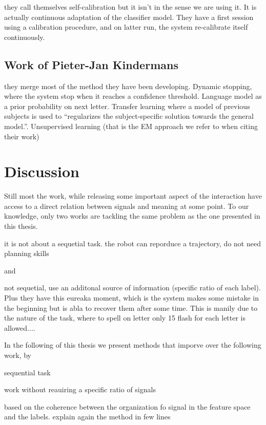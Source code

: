 \cite{schettini2014self} they call themselves self-calibration but it isn't in the sense we are using it. It is actually continuous adaptation of the classifier model. They have a first session using a calibration procedure, and on latter run, the system re-calibrate itself continuously.

\subsection{Work of Pieter-Jan Kindermans}

\cite{kindermans2014integrating} they merge most of the method they have been developing. Dynamic stopping, where the system stop when it reaches a confidence threshold. Language model as a prior probability on next letter. Transfer learning where a model of previous subjects is used to ``regularizes the subject-specific solution towards the general model.''. Unsupervised learning (that is the EM approach we refer to when citing their work)


\section{Discussion}

Still most the work, while releasing some important aspect of the interaction have access to a direct relation between signals and meaning at some point. To our knowledge, only two works are tackling the same problem as the one presented in this thesis.

 
\cite{cederborg2011imitating}
it is not about a sequetial task. the robot can reporduce a trajectory, do not need planning skills

and

\cite{Kindermans2012a,Kindermans2012b,kindermans2014integrating} not sequetial, use an additonal source of information (specific ratio of each label). Plus they have this eureaka moment, which is the system makes some mistake in the beginning but is abla to recover them after some time. This is manily due to the nature of the task, where to spell on letter only 15 flash for each letter is allowed....

In the following of this thesis we present methods that imporve over the following work, by

sequential task

work without reauiring a specific ratio of signals

based on the coherence between the organization fo signal in the feature space and the labels. explain again the method in few lines

